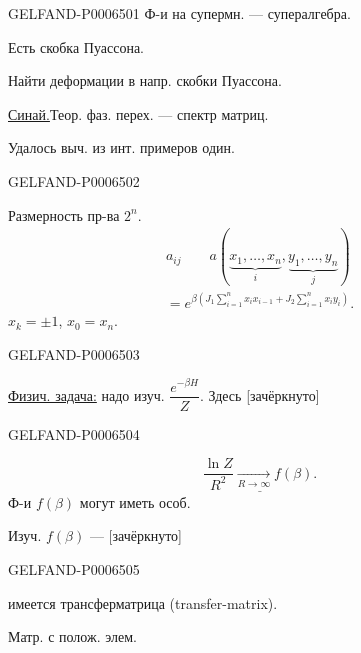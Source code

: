 \begin{GelfandAdjacentEvidence}{GELFAND-P000650}{1}
Ф-и на супермн. --- супералгебра.

Есть скобка Пуассона.

Найти деформации в напр. скобки Пуассона.

\underline{Синай.}\quad Теор. фаз. перех. --- спектр матриц.

Удалось выч. из инт. примеров один.
\end{GelfandAdjacentEvidence}
\begin{GelfandAdjacentEvidence}{GELFAND-P000650}{2}


Размерность пр-ва \(2^n\).
\[
\begin{gathered}
a_{ij}\qquad a(\underbrace{x_1,\ldots,x_n}_{i},\underbrace{y_1,\ldots,y_n}_{j})\\
={e}^{\beta\left(J_1\sum_{i=1}^n x_i x_{i-1}
                  +J_2\sum_{i=1}^n x_i y_i\right)}.
\end{gathered}
\]
\(x_k=\pm1\), \underline{\(x_0=x_n\)}.
\end{GelfandAdjacentEvidence}
\begin{GelfandAdjacentEvidence}{GELFAND-P000650}{3}


\underline{Физич. задача:} надо изуч. \(\dfrac{e^{-\beta H}}{Z}\). Здесь [зачёркнуто]
\end{GelfandAdjacentEvidence}
\begin{GelfandAdjacentEvidence}{GELFAND-P000650}{4}

\[
\underline{\frac{\ln Z}{R^2}\underset{R\to\infty}{\longrightarrow}f(\beta).}
\]
Ф-и \(f(\beta)\) могут иметь особ.

Изуч. \(f(\beta)\) --- [зачёркнуто]
\end{GelfandAdjacentEvidence}
\begin{GelfandAdjacentEvidence}{GELFAND-P000650}{5}

имеется трансферматрица (transfer-matrix).

Матр. с полож. элем.
\end{GelfandAdjacentEvidence}
